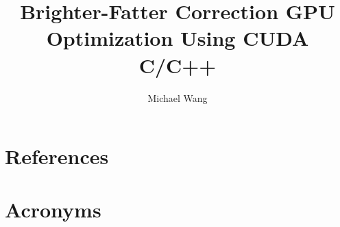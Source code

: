 \documentclass[DM,authoryear,toc]{lsstdoc}
\title{Brighter-Fatter Correction GPU Optimization Using CUDA C/C++}
\author{%
Michael Wang
}
\date{\vcsDate}
\begin{document}
\maketitle


\appendix
\section{References} \label{sec:bib}
\renewcommand{\refname}{} %


\section{Acronyms} \label{sec:acronyms}

\end{document}
